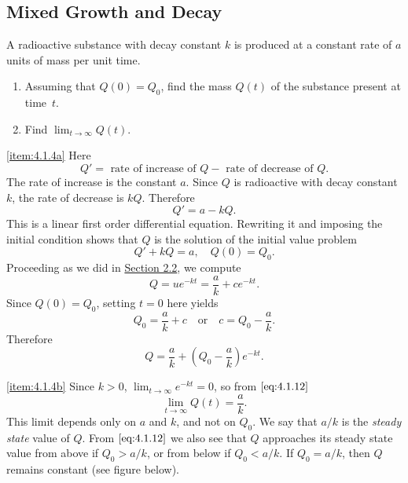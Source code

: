\documentclass{ximera}
\begin{document}
\subsection*{Mixed Growth and Decay}

\begin{example}\label{example:4.1.4}
A radioactive substance with decay constant $k$ is produced at a
constant rate of $a$ units of mass per unit time.
\begin{enumerate}
\item \label{item:4.1.4a}%
Assuming that $Q(0)=Q_0$, find the mass $Q(t)$ of the
substance present at time~$t$.

\item \label{item:4.1.4b}%
Find $\lim_{t\rightarrow\infty} Q(t)$.
\end{enumerate}
\begin{explanation}
\ref{item:4.1.4a}  Here
$$
Q'=\mbox{ rate of increase of } Q - \mbox{ rate of decrease
of } Q.
$$
The rate of increase is the constant $a$. Since $Q$ is radioactive
with decay constant $k$, the rate of decrease is $kQ$. Therefore
$$
Q'=a-kQ.
$$
This is a linear first order differential equation. Rewriting it and
imposing the initial condition shows that $Q$ is the solution of the
initial value problem
\begin{equation}  \label{eq:4.1.11}
Q'+kQ=a, \quad Q(0)=Q_0.
\end{equation}
Proceeding as we did in \href{https://xerxes.ximera.org/differentialequations/main/linearFirstOrderDiffEq/linearFirstOrderDiffEq}{Section 2.2}, we compute $$Q=ue^{-kt}=\frac{a}{k}+ce^{-kt}.$$
 Since $Q(0)=Q_0$, setting $t=0$ here yields
$$Q_0=\frac{a}{k}+c  \quad\mbox{or}\quad c=Q_0-\frac{a}{k}.$$
 Therefore
\begin{equation} \label{eq:4.1.12}
Q=\frac{a}{k}+\left(Q_0-\frac{a}{k}\right)e^{-kt}.
\end{equation}

\ref{item:4.1.4b}
Since $k > 0$,  $\lim_{t\rightarrow\infty} e^{-kt}=0$, so
from $\eqref{eq:4.1.12}$
$$
\lim_{t\rightarrow\infty} Q(t)=\frac{a}{k}.
$$
This limit depends only on $a$ and $k$, and not on $Q_0$.
We say that $a/k$ is the \textit{steady state} value of $Q$. From
$\eqref{eq:4.1.12}$ we also see that $Q$ approaches its steady state value
from above if $Q_0 > a/k$, or from below if $Q_0 < a/k$. If $Q_0=a/k$,
then $Q$ remains constant (see figure below).

\begin{center}
\end{center}


\end{explanation}
\end{example}
\end{document}
